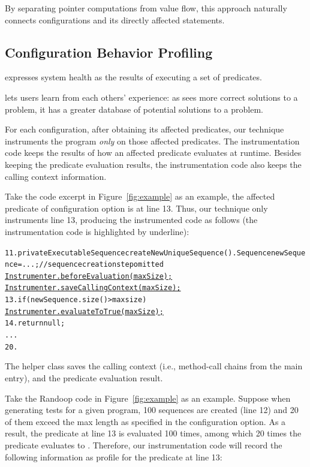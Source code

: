 By separating pointer computations from value flow,
this approach naturally connects configurations and its
directly affected statements.


\subsection{Configuration Behavior Profiling}
\label{sec:profiling}

\ourtool expresses system health as the results of executing a set of predicates.

\ourtool lets users learn from each others' experience: as \ourtool sees more correct
solutions to a problem, it has a greater database of potential solutions to
a problem.

For each configuration, after obtaining its affected predicates, our technique
instruments the program \textit{only} on those affected predicates. The instrumentation
code keeps the results of how an affected predicate evaluates at runtime. Besides keeping
the predicate evaluation results, the instrumentation code also keeps
the calling context information.

Take the code excerpt in Figure~\ref{fig:example} as an example, the affected
predicate of configuration option  is at line 13. Thus, our technique
only instruments line 13, producing the instrumented
code as follows (the instrumentation code is highlighted by underline):


\begin{CodeOut}
\begin{alltt}
11. private ExecutableSequence createNewUniqueSequence() .   Sequence newSequence = ...; //sequence creation step omitted
      \underline{Instrumenter.beforeEvaluation(maxSize);}
      \underline{Instrumenter.saveCallingContext(maxSize);}
13.   if (newSequence.size() > maxsize) \ttlcb
        \underline{Instrumenter.evaluateToTrue(maxSize);}
14.     return null;
      ...
20. \ttrcb
\end{alltt}
\end{CodeOut}

The helper class  saves the calling context (i.e.,
method-call chains from the main entry), and the predicate evaluation result.

Take the Randoop code in Figure~\ref{fig:example} as an example. Suppose when
generating tests for a given program, 100 sequences are created (line 12) and 20
of them exceed the max length as specified in the  configuration option.
As a result, the predicate at line 13 is evaluated 100 times, among which 20 times the
predicate evaluates to . Therefore,
our instrumentation code will record the following information as profile for the predicate
at line 13:

